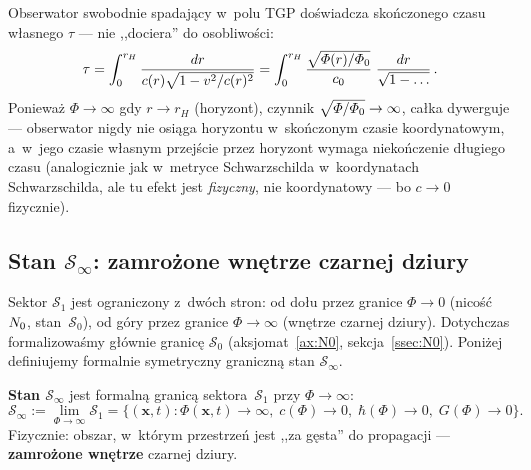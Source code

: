 \begin{corollary}\label{cor:proper-time-finite}
Obserwator swobodnie spadaj\k{a}cy w~polu TGP
do\'swiadcza sko\'nczonego czasu w\l{}asnego $\tau$ ---
nie ,,dociera'' do osobliwo\'sci:
\begin{equation}\label{eq:proper-time}
  \tau = \int_0^{r_H} \frac{dr}{c(r)\sqrt{1 - v^2/c(r)^2}}
  = \int_0^{r_H} \frac{\sqrt{\varPhi(r)/\varPhi_0}}{c_0}\;
    \frac{dr}{\sqrt{1 - \ldots}}\,.
\end{equation}
Poniewa\.z $\Phi \to \infty$ gdy $r \to r_H$
(horyzont), czynnik $\sqrt{\varPhi/\varPhi_0} \to \infty$,
ca\l{}ka dywerguje --- obserwator nigdy nie osi\k{a}ga
horyzontu w~sko\'nczonym czasie koordynatowym, a~w~jego
czasie w\l{}asnym przej\'scie przez horyzont wymaga
nieko\'nczenie d\l{}ugiego czasu (analogicznie jak
w~metryce Schwarzschilda w~koordynatach Schwarzschilda,
ale tu efekt jest \emph{fizyczny}, nie koordynatowy ---
bo $c \to 0$ fizycznie).
\end{corollary}

\subsection{Stan $\mathcal{S}_\infty$: zamro\.zone wn\k{e}trze
  czarnej dziury}\label{ssec:s-infty}

Sektor $\mathcal{S}_1$ jest ograniczony z~dw\'och stron:
od do\l{}u przez granice $\Phi \to 0$ (nico\'s\'c $N_0$, stan~$\mathcal{S}_0$),
od g\'ory przez granice $\Phi \to \infty$ (wn\k{e}trze czarnej dziury).
Dotychczas formalizowa\'smy g\l{}\'ownie granic\k{e} $\mathcal{S}_0$
(aksjomat~\ref{ax:N0}, sekcja~\ref{ssec:N0}).
Poni\.zej definiujemy formalnie symetryczny graniczn\k{a} stan
$\mathcal{S}_\infty$.

\begin{definition}\label{def:s-infty}
\textbf{Stan $\mathcal{S}_\infty$} jest formaln\k{a} granic\k{a}
sektora~$\mathcal{S}_1$ przy $\Phi \to \infty$:
\begin{equation}\label{eq:s-infty-def}
  \mathcal{S}_\infty
  := \lim_{\Phi \to \infty} \mathcal{S}_1
  = \bigl\{(\mathbf{x}, t) : \Phi(\mathbf{x},t) \to \infty,\;
    c(\Phi) \to 0,\;\hbar(\Phi) \to 0,\;G(\Phi) \to 0\bigr\}.
\end{equation}
Fizycznie: obszar, w~kt\'orym przestrze\'n jest
,,za g\k{e}sta'' do propagacji --- \textbf{zamro\.zone wn\k{e}trze}
czarnej dziury.
\end{definition}

